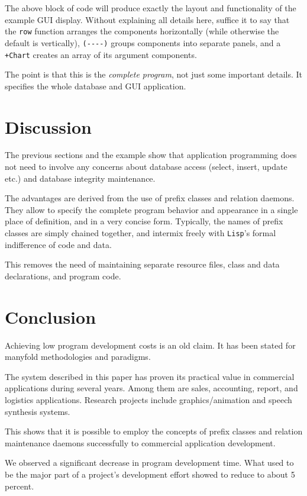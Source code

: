 The above block of code will produce exactly the layout and
functionality of the example GUI display. Without explaining all details
here, suffice it to say that the \texttt{row} function arranges the components
horizontally (while otherwise the default is vertically), \texttt{(-{}-{}-{}-)}
groups components into separate panels, and a \texttt{+Chart} creates an array
of its argument components.

The point is that this is the \emph{complete program}, not just some
important details. It specifies the whole database and GUI application.

 
\section{Discussion}
\label{sec:ul-discussion}

The previous sections and the example show that application programming
does not need to involve any concerns about database access (select,
insert, update etc.) and database integrity maintenance.

The advantages are derived from the use of prefix classes and relation
daemons. They allow to specify the complete program behavior and
appearance in a single place of definition, and in a very concise form.
Typically, the names of prefix classes are simply chained together, and
intermix freely with \texttt{Lisp}'s formal indifference of code and data.

This removes the need of maintaining separate resource files, class and
data declarations, and program code.

 
\section{Conclusion}
\label{sec:ul-conclusion}

Achieving low program development costs is an old claim. It has been
stated for manyfold methodologies and paradigms.

The system described in this paper has proven its practical value in
commercial applications during several years. Among them are sales,
accounting, report, and logistics applications. Research projects
include graphics/animation and speech synthesis systems.

This shows that it is possible to employ the concepts of prefix classes
and relation maintenance daemons successfully to commercial application
development.

We observed a significant decrease in program development time. What
used to be the major part of a project's development effort showed to
reduce to about 5 percent.

